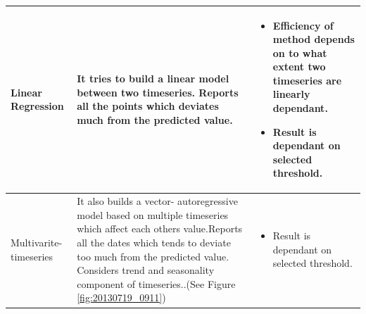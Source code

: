 \documentclass[a4paper,10pt]{article}
\begin{document}
\begin{table}[H]
{\begin{tabular}{|L{3cm} | L{5cm} | L{8cm}|}
Linear Regression                     & It tries to build a linear model between two timeseries. Reports all the points which deviates much from the predicted value.                                                                                                                                          & \begin{itemize}
                                                                                                                                                                                                                                                                                                                  \item Efficiency of method depends on to what extent two timeseries are linearly dependant.
                                                                                                                                                                                                                                                                                                                  \item Result is dependant on selected threshold.                                                                                                                                                                                                                                                        
                                                                                                                                                                                                                                                                                                                 \end{itemize}
  \\ \hline
Multivarite- timeseries               & It also builds a vector- autoregressive model based on multiple timeseries which affect each others value.Reports all the dates which tends to deviate too much from the predicted value. Considers trend and seasonality component of timeseries..(See Figure \ref{fig:20130719_0911}) & \begin{itemize}
                                                                                                                                                                                                                                                                                                                  \item Result is dependant on selected threshold.

\end{itemize}
\end{tabular}}
\end{table}
\end{document}
